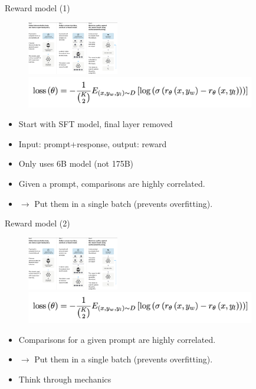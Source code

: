 \begin{vbframe}{Reward model (1)}


\begin{figure}
\centering
\includegraphics[width = 4cm]{figure/threesteps.png}\\
\includegraphics[width = 10cm]{figure/rewardloss.png}
\end{figure}


\begin{itemize}
	\item Start with SFT model, final layer removed
        	\item Input: prompt+response, output: reward
        \item Only uses 6B model (not 175B)
        \item Given a prompt, comparisons  
      are
        	highly correlated.
                \item $\rightarrow$ Put them in
        	a single batch (prevents overfitting).
\end{itemize}

\vfill

\end{vbframe}

\begin{vbframe}{Reward model (2)}


\begin{figure}
\centering
\includegraphics[width = 4cm]{figure/threesteps.png}\\
\includegraphics[width = 10cm]{figure/rewardloss.png}
\end{figure}


\begin{itemize}
        \item Comparisons  for a
        	given prompt are
        	highly correlated.
                \item $\rightarrow$ Put them in
        	a single batch (prevents overfitting).
\item \ques Think through mechanics
\end{itemize}

\vfill

\end{vbframe}


